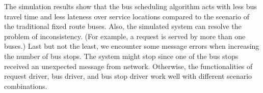 \documentclass[runningheads]{llncs}
\begin{document}
The simulation results show that the bus scheduling algorithm acts with less bus travel time and less lateness over service locations compared to the scenario of the traditional fixed route buses. Also, the simulated system can resolve the problem of inconsistency. (For example, a request is served by more than one buses.) Last but not the least, we encounter some message errors when increasing the number of bus stops. The system might stop since one of the bus stops received an unexpected message from network. Otherwise, the functionalities of request driver, bus driver, and bus stop driver work well with different scenario combinations.

% 
\end{document}

